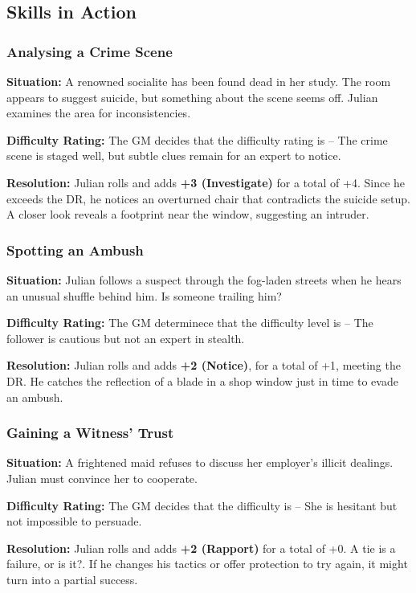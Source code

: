 \subsection{Skills in Action}

\subsubsection{Analysing a Crime Scene}
\begin{DndReadAloud}{}
	\textbf{Situation:} A renowned socialite has been found dead in her study. The room appears to suggest suicide, but something about the scene seems off. Julian examines the area for inconsistencies.

	\noindent
	\textbf{Difficulty Rating:} The GM decides that the difficulty rating is \Formidable – The crime scene is staged well, but subtle clues remain for an expert to notice.

	\noindent
	\textbf{Resolution:} Julian rolls  and adds \textbf{+3 (Investigate)} for a total of +4. Since he exceeds the DR, he notices an overturned chair that contradicts the suicide setup. A closer look reveals a footprint near the window, suggesting an intruder.
\end{DndReadAloud}

\subsubsection{Spotting an Ambush}
\begin{DndReadAloud}{}
	\textbf{Situation:} Julian follows a suspect through the fog-laden streets when he hears an unusual shuffle behind him. Is someone trailing him?

	\noindent\textbf{Difficulty Rating:} The GM determinece that the difficulty level is \Difficult – The follower is cautious but not an expert in stealth.

	\noindent\textbf{Resolution:} Julian rolls  and adds  \textbf{+2 (Notice)}, for a total of +1, meeting the DR. He catches the reflection of a blade in a shop window just in time to evade an ambush.
\end{DndReadAloud}

\subsubsection{Gaining a Witness’ Trust}
\begin{DndReadAloud}{}
	\textbf{Situation:} A frightened maid refuses to discuss her employer’s illicit dealings. Julian must convince her to cooperate.

	\noindent\textbf{Difficulty Rating:} The GM decides that the difficulty is \Challenging – She is hesitant but not impossible to persuade.

	\noindent\textbf{Resolution:} Julian rolls \FudgeRes{+---} and adds \textbf{+2 (Rapport)} for a total of +0. A tie is a failure, or is it?. If he  changes his tactics or offer protection to try again, it might turn into a partial success.
\end{DndReadAloud}

